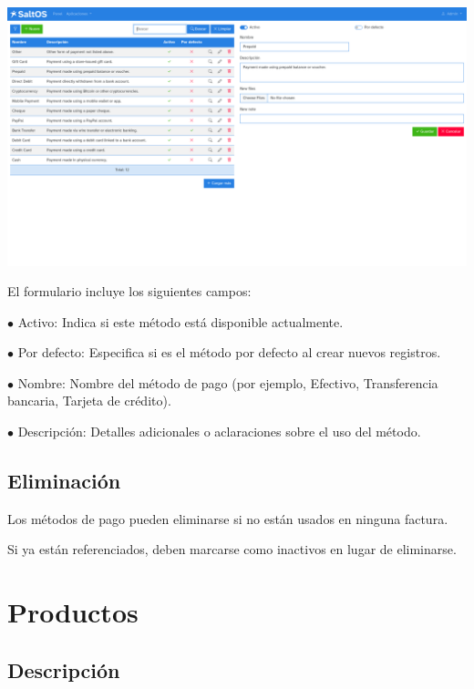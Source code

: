 \documentclass[a4paper]{article}
\begin{document}
\begin{center}\includegraphics[width=1\textwidth]{../ujest/snaps/test-screenshots-js-screenshots-sales-payment-methods-edit-10-es-es-1-snap.png}\end{center}

El formulario incluye los siguientes campos:

\begin{compactitem}
\item[\color{myblue}$\bullet$] Activo: Indica si este método está disponible actualmente.
\item[\color{myblue}$\bullet$] Por defecto: Especifica si es el método por defecto al crear nuevos registros.
\item[\color{myblue}$\bullet$] Nombre: Nombre del método de pago (por ejemplo, Efectivo, Transferencia bancaria, Tarjeta de crédito).
\item[\color{myblue}$\bullet$] Descripción: Detalles adicionales o aclaraciones sobre el uso del método.
\end{compactitem}

\hypertarget{toc150}{}
\subsection{Eliminación}

Los métodos de pago pueden eliminarse si no están usados en ninguna factura.

Si ya están referenciados, deben marcarse como inactivos en lugar de eliminarse.


\hypertarget{toc151}{}
\section{Productos}

\hypertarget{toc152}{}
\subsection{Descripción}
\end{document}

